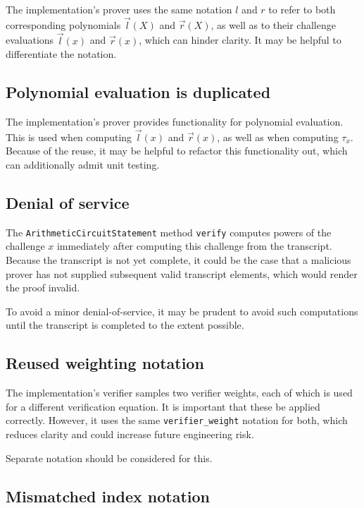 \documentclass{article}
\begin{document}
The implementation's prover uses the same notation $l$ and $r$ to refer to both corresponding polynomials $\vec{l}(X)$ and $\vec{r}(X)$, as well as to their challenge evaluations $\vec{l}(x)$ and $\vec{r}(x)$, which can hinder clarity.
It may be helpful to differentiate the notation.


\subsection{Polynomial evaluation is duplicated}

The implementation's prover provides functionality for polynomial evaluation.
This is used when computing $\vec{l}(x)$ and $\vec{r}(x)$, as well as when computing $\tau_x$.
Because of the reuse, it may be helpful to refactor this functionality out, which can additionally admit unit testing.


\subsection{Denial of service}

The \texttt{ArithmeticCircuitStatement} method \texttt{verify} computes powers of the challenge $x$ immediately after computing this challenge from the transcript.
Because the transcript is not yet complete, it could be the case that a malicious prover has not supplied subsequent valid transcript elements, which would render the proof invalid.

To avoid a minor denial-of-service, it may be prudent to avoid such computations until the transcript is completed to the extent possible.


\subsection{Reused weighting notation}

The implementation's verifier samples two verifier weights, each of which is used for a different verification equation.
It is important that these be applied correctly.
However, it uses the same \texttt{verifier\_weight} notation for both, which reduces clarity and could increase future engineering risk.

Separate notation should be considered for this.


\subsection{Mismatched index notation}
\end{document}
